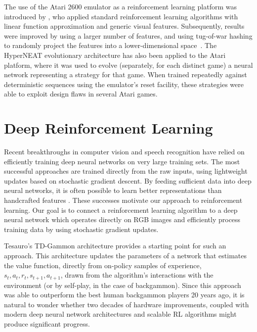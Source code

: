 \documentclass{article} \usepackage{nips13submit_e,times}
\begin{document}
The use of the Atari 2600 emulator as a reinforcement learning platform was introduced by \cite{bellemare-ale}, who applied standard reinforcement learning algorithms with linear function approximation and generic visual features. Subsequently, results were improved by using a larger number of features, and using tug-of-war hashing to randomly project the features into a lower-dimensional space~\cite{bellemare2012sketch}. The HyperNEAT evolutionary architecture \cite{hausknecht-neuro} has also been applied to the Atari platform, where it was used to evolve (separately, for each distinct game) a neural network representing a strategy for that game. When trained repeatedly against deterministic sequences using the emulator's reset facility, these strategies were able to exploit design flaws in several Atari games. 
















 
\section{Deep Reinforcement Learning}
\label{sec:method}


Recent breakthroughs in computer vision and speech recognition have relied on efficiently training deep neural networks on very large training sets.
The most successful approaches are trained directly from the raw inputs, using lightweight updates based on stochastic gradient descent. By feeding sufficient data into deep neural networks, it is often possible to learn better representations than handcrafted features \cite{krizhevsky-imagenet}. These successes motivate our approach to reinforcement learning. Our goal is to connect a reinforcement learning algorithm to a deep neural network which operates directly on RGB images and efficiently process training data by using stochastic gradient updates. 

Tesauro's TD-Gammon architecture provides a starting point for such an approach. This architecture updates the parameters of a network that estimates the value function, directly from on-policy samples of experience, $s_t, a_t, r_t, s_{t+1}, a_{t+1}$, drawn from the algorithm's interactions with the environment (or by self-play, in the case of backgammon). Since this approach was able to outperform the best human backgammon players 20 years ago, it is natural to wonder whether two decades of hardware improvements, coupled with modern deep neural network architectures and scalable RL algorithms might produce significant progress. 
\end{document}
